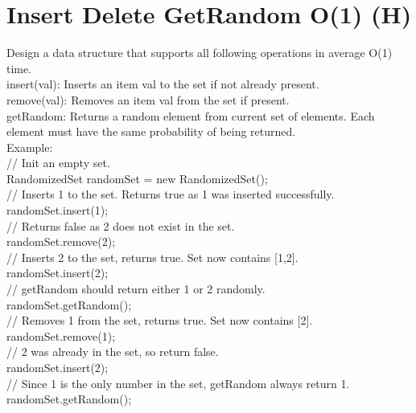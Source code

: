 \section{Insert Delete GetRandom O(1) (H)}
Design a data structure that supports all following operations in average O(1) time.\\
    insert(val): Inserts an item val to the set if not already present.\\
    remove(val): Removes an item val from the set if present.\\
    getRandom: Returns a random element from current set of elements. Each element must have the same probability of being returned.\\

Example:\\
// Init an empty set.\\
RandomizedSet randomSet = new RandomizedSet();\\

// Inserts 1 to the set. Returns true as 1 was inserted successfully.\\
randomSet.insert(1);\\

// Returns false as 2 does not exist in the set.\\
randomSet.remove(2);\\

// Inserts 2 to the set, returns true. Set now contains [1,2].\\
randomSet.insert(2);\\

// getRandom should return either 1 or 2 randomly.\\
randomSet.getRandom();\\

// Removes 1 from the set, returns true. Set now contains [2].\\
randomSet.remove(1);\\

// 2 was already in the set, so return false.\\
randomSet.insert(2);\\

// Since 1 is the only number in the set, getRandom always return 1.\\
randomSet.getRandom();\\

